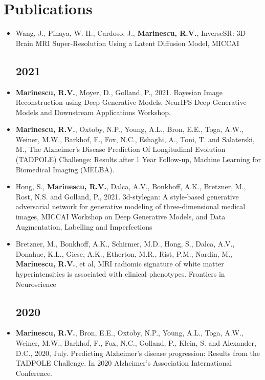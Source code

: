 \documentclass[a4paper,10pt]{article} %
\begin{document}
\section*{Publications}

\newcommand{\poster}{\textcolor{red}{Poster}}
\newcommand{\talk}{\textcolor{green!60!black}{Talk}}
\newcommand{\journal}{\textcolor{blue}{Journal}}


\begin{itemize}
\subsection*{2023}
\item[\poster]  Wang, J., Pinaya, W. H., Cardoso, J., \textbf{Marinescu, R.V.}, InverseSR: 3D Brain MRI Super-Resolution Using a Latent Diffusion Model, MICCAI

\subsection*{2021}
\item[\talk] \textbf{Marinescu, R.V.}, Moyer, D., Golland, P., 2021. Bayesian Image Reconstruction using Deep Generative Models. NeurIPS Deep Generative Models and Downstream Applications Workshop.
\item[\journal] \textbf{Marinescu, R.V.}, Oxtoby, N.P., Young, A.L., Bron, E.E., Toga, A.W., Weiner, M.W., Barkhof, F., Fox, N.C., Eshaghi, A., Toni, T. and Salaterski, M., The Alzheimer's Disease Prediction Of Longitudinal Evolution (TADPOLE) Challenge: Results after 1 Year Follow-up, Machine Learning for Biomedical Imaging (MELBA).
\item[\poster] Hong, S., \textbf{Marinescu, R.V.}, Dalca, A.V., Bonkhoff, A.K., Bretzner, M., Rost, N.S. and Golland, P., 2021. 3d-stylegan: A style-based generative adversarial network for generative modeling of three-dimensional medical images, MICCAI Workshop on Deep Generative Models, and Data Augmentation, Labelling and Imperfections 
\item[\journal] Bretzner, M., Bonkhoff, A.K., Schirmer, M.D., Hong, S., Dalca, A.V., Donahue, K.L., Giese, A.K., Etherton, M.R., Rist, P.M., Nardin, M., \textbf{Marinescu, R.V.}, et al, MRI radiomic signature of white matter hyperintensities is associated with clinical phenotypes. Frontiers in Neuroscience

\subsection*{2020}
\item[\talk] \textbf{Marinescu, R.V.}, Bron, E.E., Oxtoby, N.P., Young, A.L., Toga, A.W., Weiner, M.W., Barkhof, F., Fox, N.C., Golland, P., Klein, S. and Alexander, D.C., 2020, July. Predicting Alzheimer's disease progression: Results from the TADPOLE Challenge. In 2020 Alzheimer's Association International Conference.


\end{itemize}
\end{document}
